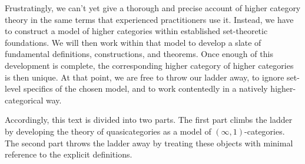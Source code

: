 

\minidiv

\noindent Frustratingly, we can't yet give a thorough and precise account of higher category theory in the same terms that experienced practitioners use it.
Instead, we have to construct a model of higher categories within established set-theoretic foundations.
We will then work within that model to develop a slate of fundamental definitions, constructions, and theorems.
Once enough of this development is complete,
the corresponding higher category of higher categories is then unique.
At that point, we are free to throw our ladder away, to ignore set-level specifics of the chosen model, and to work contentedly in a natively higher-categorical way.

Accordingly, this text is divided into two parts.
The first part climbs the ladder by developing the theory of quasicategories as a model of $(\infty,1)$-categories.
The second part throws the ladder away by treating these objects with minimal reference to the explicit definitions.
